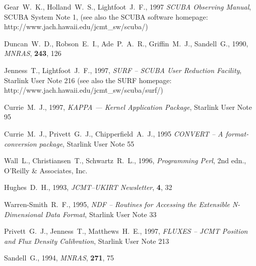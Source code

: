 \documentclass[twoside,11pt,fleqn]{article}
\newcommand{\htmladdnormallink}[2]{#1}
\newcommand{\xref}[3]{#1}
\begin{document}
\clearpage
\begin{thebibliography}{}

Gear~W.~K., Holland~W.~S., Lightfoot~J.~F., 1997
\textit{SCUBA Observing Manual}, \htmladdnormallink{SCUBA System Note
1}{http://www.jach.hawaii.edu/jcmt_sw/scuba/}, (see also the SCUBA software homepage:
\htmladdnormallink{http://www.jach.hawaii.edu/jcmt\_sw/scuba/}{http://www.jach.hawaii.edu/jcmt_sw/scuba/})


Duncan~W.~D., Robson~E.~I., Ade~P.~A.~R., Griffin~M.~J., Sandell~G., 1990,
\textit{MNRAS}, \textbf{243}, 126

Jenness~T., Lightfoot~J.~F., 1997, \textit{SURF -- SCUBA User Reduction Facility},
\xref{Starlink User Note 216}{sun216}{} (see also the SURF homepage:
\htmladdnormallink{http://www.jach.hawaii.edu/jcmt\_sw/scuba/surf/}{http://www.jach.hawaii.edu/jcmt_sw/scuba/surf/})

Currie~M.~J., 1997, {\it KAPPA --- Kernel Application Package},
\xref{Starlink User Note 95}{sun95}{}

Currie~M.~J., Privett~G.~J., Chipperfield~A.~J., 1995 {\it CONVERT --
A format-conversion package}, \xref{Starlink User Note 55}{sun55}{}

Wall~L., Christiansen~T., Schwartz~R.~L., 1996, 
\htmladdnormallink{\textit{Programming Perl}}{http://www.perl.org/}, 2nd
edn., \htmladdnormallink{O'Reilly \& Associates, Inc.}{http://www.ora.com/}

Hughes~D.~H., 1993, {\it JCMT--UKIRT Newsletter}, {\bf 4}, 32

Warren-Smith~R.~F., 1995, {\it NDF -- Routines for Accessing the Extensible
N-Dimensional Data Format}, \xref{Starlink User Note 33}{sun33}{}

Privett~G.~J., Jenness~T., Matthews~H.~E., 1997, {\it FLUXES --
JCMT Position and Flux Density Calibration}, 
\xref{Starlink User Note 213}{sun213}{}

Sandell~G., 1994, \textit{MNRAS}, \textbf{271}, 75

\end{thebibliography}
\end{document}
